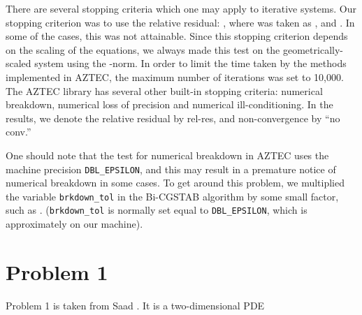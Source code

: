 \documentclass[12pt,a4paper]{article}
\newcounter{i}
\begin{document}
There are several stopping criteria which one may apply to iterative
systems.  Our stopping criterion was to use the relative residual:
, where  was taken as
,  and .  In some of the cases, this was
not attainable.  Since this stopping criterion depends on the scaling
of the equations, we always made this test on the geometrically-scaled
system using the -norm.
In order to limit the time taken by the methods implemented in AZTEC, 
the maximum number of iterations was set to 10,000.  The AZTEC library 
has several other built-in stopping criteria:  numerical breakdown, 
numerical loss of precision and numerical ill-conditioning.
In the results, we denote the relative residual by rel-res, and 
non-convergence by ``no conv.''

One should note that the test for numerical breakdown in AZTEC uses 
the machine precision {\tt DBL\_EPSILON}, and this may result in a
premature notice of numerical breakdown in some cases.  To get around 
this problem, we multiplied the variable {\tt brkdown\_tol} in the 
Bi-CGSTAB algorithm by some small factor, such as .
({\tt brkdown\_tol} is normally set equal to {\tt DBL\_EPSILON}, 
which is approximately  on our machine).  




\section{Problem 1}
\label{prob1}

Problem 1 is taken from Saad \cite[\S 3.7, problem F2DB]{Saad03}.  
It is a two-dimensional PDE
\end{document}
